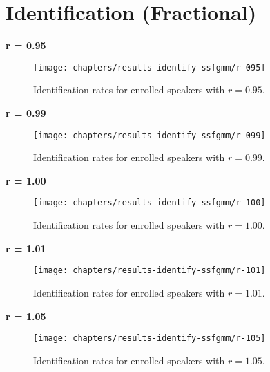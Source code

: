 \chapter{Identification (Fractional)}
\label{apx:results-identify-ssfgmm}

\noindent \textbf{r = 0.95}



\begin{figure}[ht]
	\centering
	\texttt{[image: chapters/results-identify-ssfgmm/r-095]}
	\caption{Identification rates for enrolled speakers with $r = 0.95$.}
	\label{fig:r-095}
\end{figure}

\newpage
\noindent \textbf{r = 0.99}



\begin{figure}[ht]
	\centering
	\texttt{[image: chapters/results-identify-ssfgmm/r-099]}
	\caption{Identification rates for enrolled speakers with $r = 0.99$.}
	\label{fig:r-099}
\end{figure}

\newpage
\noindent \textbf{r = 1.00}



\begin{figure}[ht]
	\centering
	\texttt{[image: chapters/results-identify-ssfgmm/r-100]}
	\caption{Identification rates for enrolled speakers with $r = 1.00$.}
	\label{fig:r-100}
\end{figure}

\newpage
\noindent \textbf{r = 1.01}



\begin{figure}[ht]
	\centering
	\texttt{[image: chapters/results-identify-ssfgmm/r-101]}
	\caption{Identification rates for enrolled speakers with $r = 1.01$.}
	\label{fig:r-101}
\end{figure}

\newpage
\noindent \textbf{r = 1.05}



\begin{figure}[ht]
	\centering
	\texttt{[image: chapters/results-identify-ssfgmm/r-105]}
	\caption{Identification rates for enrolled speakers with $r = 1.05$.}
	\label{fig:r-105}
\end{figure}
